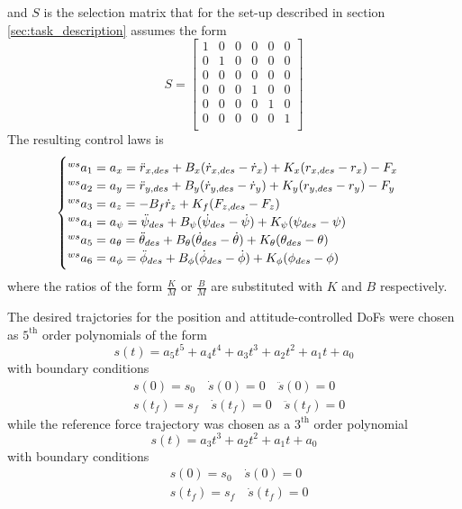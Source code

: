 and $S$ is the selection matrix that for the set-up described in section \ref{sec:task_description} assumes the form
\[
S =
\begin {bmatrix}
  1 & 0 & 0 & 0 & 0 & 0\\
  0 & 1 & 0 & 0 & 0 & 0\\
  0 & 0 & 0 & 0 & 0 & 0\\
  0 & 0 & 0 & 1 & 0 & 0\\
  0 & 0 & 0 & 0 & 1 & 0\\
  0 & 0 & 0 & 0 & 0 & 1\\
\end {bmatrix}
\]
The resulting control laws is
\begin{equation}\label{eq:final_a_cmd}
\begin{cases}
\prescript{ws}{}{a}_1 = a_x = \ddot{r}_{x,des} + B_x (\dot{r}_{x,des} - \dot{r}_x) + K_x (r_{x,des} - r_x) - F_x \\
\prescript{ws}{}{a}_2 = a_y = \ddot{r}_{y,des} + B_y (\dot{r}_{y,des} - \dot{r}_y) + K_y (r_{y,des} - r_y) - F_y \\
\prescript{ws}{}{a}_3 = a_z = - B_f \dot{r}_z + K_f(F_{z,des} - F_z) \\
\prescript{ws}{}{a}_4 = a_{\psi} = \ddot{\psi}_{des} + B_{\psi} (\dot{\psi}_{des} - \dot{\psi}) + K_{\psi} (\psi_{des} - \psi) \\
\prescript{ws}{}{a}_5 = a_{\theta} = \ddot{\theta}_{des} + B_{\theta} (\dot{\theta}_{des} - \dot{\theta}) + K_{\theta} (\theta_{des} - \theta) \\
\prescript{ws}{}{a}_6 = a_{\phi} = \ddot{\phi}_{des} + B_{\phi} (\dot{\phi}_{des} - \dot{\phi}) + K_{\phi} (\phi_{des} - \phi)
\end{cases}
\end{equation}
where the ratios of the form $\frac{K}{M}$ or $\frac{B}{M}$ are substituted with $K$ and $B$ respectively.
\par
The desired trajctories for the position and attitude-controlled DoFs were chosen as  $5^\text{th}$ order polynomials of the form
\[
s(t) = a_5 t^5 + a_4 t^4 + a_3 t^3 + a_2 t^2 +a_1 t + a_0
\]
with boundary conditions
\[
\begin{split}
  &s(0) = s_0 \quad \dot{s}(0) = 0 \quad \ddot{s}(0) = 0\\
  &s(t_f) = s_f \quad \dot{s}(t_f) = 0 \quad \ddot{s}(t_f) = 0
\end{split}
\]
while the reference force trajectory was chosen as a $3^\text{th}$ order polynomial
\[
s(t) = a_3 t^3 + a_2 t^2 +a_1 t + a_0
\] 
with boundary conditions
\[
\begin{split}
  &s(0) = s_0 \quad \dot{s}(0) = 0\\
  &s(t_f) = s_f \quad \dot{s}(t_f) = 0
\end{split}
\]
\newpage
